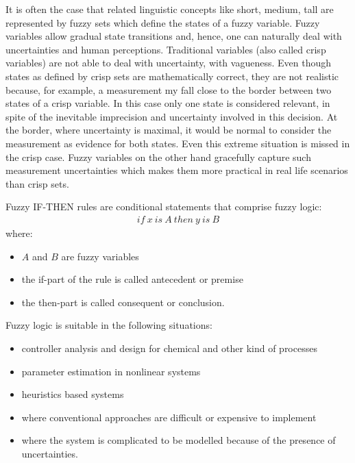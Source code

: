 It is often the case that related linguistic concepts like short, medium, tall are represented by fuzzy sets which define the states of a fuzzy variable.
Fuzzy variables allow gradual state transitions and, hence, one can naturally deal with uncertainties and human perceptions. Traditional variables (also called crisp variables) are not able to deal with uncertainty, with vagueness. Even though states as defined by crisp sets are mathematically correct, they are not realistic because, for example, a measurement my fall close to the border between two states of a crisp variable. In this case only one state is considered relevant, in spite of the inevitable imprecision and uncertainty involved in this decision. At the border, where uncertainty is maximal, it would be normal to consider the measurement as evidence for both states. Even this extreme situation is missed in the crisp case. Fuzzy variables on the other hand gracefully capture such measurement uncertainties which makes them more practical in real life scenarios than crisp sets.

\begin{definition}
Fuzzy IF-THEN rules are conditional statements that comprise fuzzy logic:
\begin{align}
if ~ x~ is~ A ~then~ y~ is~ B
\end{align}
where:
\begin{itemize}
\item $A$ and $B$ are fuzzy variables 
\item the if-part of the rule is called antecedent or premise 
\item the then-part is called consequent or conclusion. 
\end{itemize}
\end{definition}

Fuzzy logic is suitable in the following situations\cite{Kumar05Fuzzy}:
\begin{itemize}
\item controller analysis and design for chemical and other kind of processes 
\item parameter estimation in nonlinear systems  
\item heuristics based systems
\item where conventional approaches are difficult or expensive to implement 
\item where the system is complicated to be modelled because of the presence of uncertainties.
\end{itemize}

